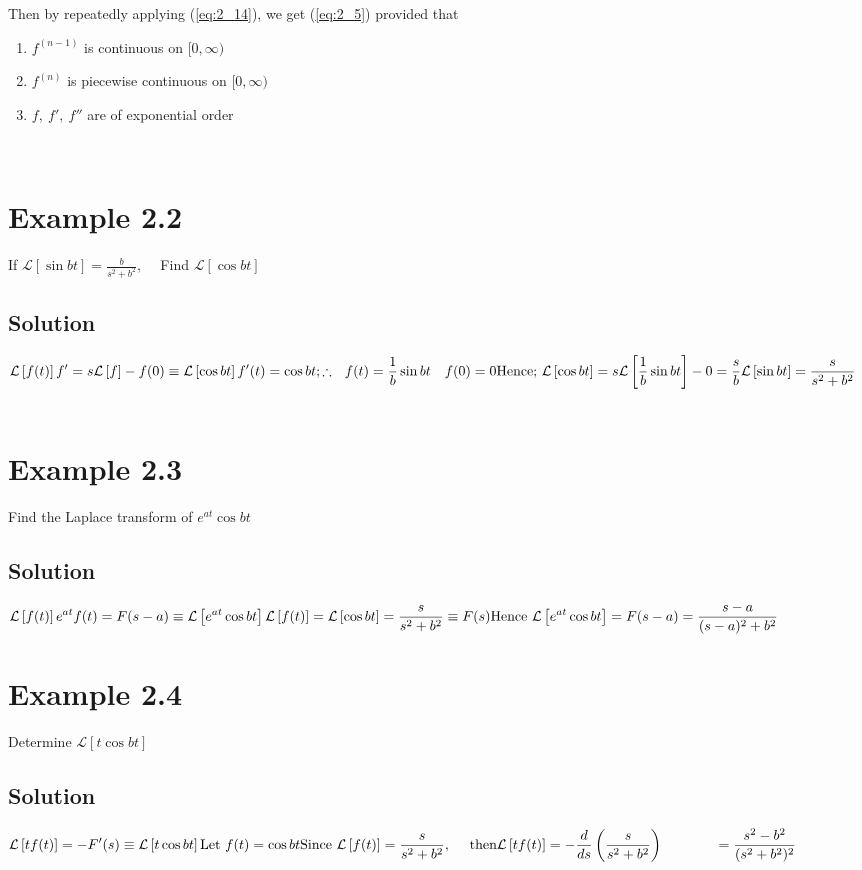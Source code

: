 \documentclass[11pt]{report}
\newcommand{\Laplace}{\mathcal{L}}
\newcommand{\ft}{f(t)}
\newcommand{\sbracket}[1]{\left[#1\right]}
\newcommand{\LFt}{\Laplace \sbracket{\ft}}
\newcommand{\LFn}[1]{\Laplace \sbracket{#1}}
\newcommand{\sps}{\\[0.2cm]}
\newcommand{\refn}[1]{(\ref{#1})}
\newcommand{\refx}[1]{\refn{eq:#1}}
\newcommand{\dsp}{\displaystyle}
\newcommand{\sprime}{'}
\newcommand{\dprime}{''}
\begin{document}
	Then by repeatedly applying \refx{2_14}, we get \refx{2_5} provided that
	\begin{enumerate}
		\item $f^{(n-1)}$ is continuous on $[0, \infty)$
		\item $f^{(n)}$ is piecewise continuous on $[0, \infty)$
		\item $f,~f\sprime,~f\dprime$ are of exponential order
	\end{enumerate}
	~ {}\sps
	\section*{Example 2.2}
	If $\dsp \LFn{\sin bt} = \frac{b}{s^2+b^2}, ~~~~$ Find $\LFn{\cos bt}$\\
	\subsection*{Solution}
	$\dsp
	\LFt{f\sprime} = s\LFn{f} - f(0) \equiv \LFn{\cos bt}\sps
	f\sprime(t)=\cos bt;\sps
	\therefore~~ \ft = \frac{1}{b}\sin bt ~~~ f(0) = 0\sps
	\text{Hence; }\\ 
	\LFn{\cos bt} = s\LFn{\frac{1}{b}\sin bt} - 0 = \frac{s}{b}\LFn{\sin bt} = \frac{s}{s^2 + b^2}
	$\sps\sps
	\section*{Example 2.3}
	Find the Laplace transform of $e^{at}\cos bt$
	\subsection*{Solution}
	$\dsp
	\LFt{e^{at}\ft} = F(s-a) \equiv \LFn{e^{at}\cos bt}\sps
	\LFt = \LFn{\cos bt} = \frac{s}{s^2 + b^2} \equiv F(s)\sps
	\text{Hence }\\ 
	\LFn{e^{at} \cos bt} = F(s-a) = \frac{s-a}{(s-a)^2 + b^2}
	$\\
	
	\section*{Example 2.4}
	Determine $\LFn{t\cos bt}$
	
	\subsection*{Solution}
	$\dsp
	\LFn{t\ft} = - F\sprime(s) \equiv \LFn{t\cos bt}\sps
	\text{Let } \ft = \cos bt\\
	\text{Since } \LFt = \frac{s}{s^2+b^2},~~~~ \text{then}\\
	\LFn{t\ft} = - \frac{d}{ds}\left(\frac{s}{s^2 + b^2}\right) \\{~}~~~~~~\quad~=\frac{s^2-b^2}{(s^2+b^2)^2}
	$
\end{document}
